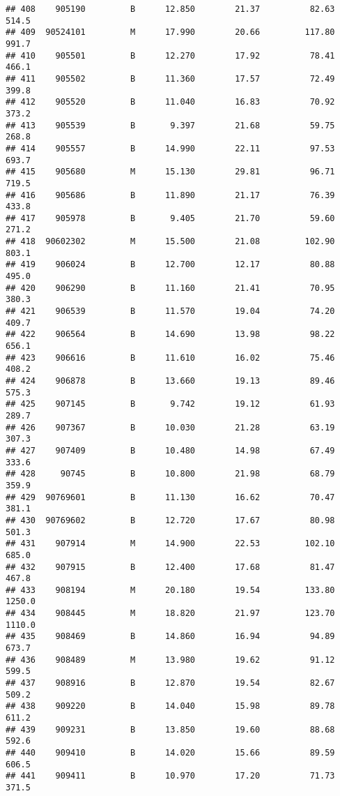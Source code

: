 \documentclass[
]{article}
\begin{document}
\begin{verbatim}
## 408    905190         B      12.850        21.37          82.63     514.5
## 409  90524101         M      17.990        20.66         117.80     991.7
## 410    905501         B      12.270        17.92          78.41     466.1
## 411    905502         B      11.360        17.57          72.49     399.8
## 412    905520         B      11.040        16.83          70.92     373.2
## 413    905539         B       9.397        21.68          59.75     268.8
## 414    905557         B      14.990        22.11          97.53     693.7
## 415    905680         M      15.130        29.81          96.71     719.5
## 416    905686         B      11.890        21.17          76.39     433.8
## 417    905978         B       9.405        21.70          59.60     271.2
## 418  90602302         M      15.500        21.08         102.90     803.1
## 419    906024         B      12.700        12.17          80.88     495.0
## 420    906290         B      11.160        21.41          70.95     380.3
## 421    906539         B      11.570        19.04          74.20     409.7
## 422    906564         B      14.690        13.98          98.22     656.1
## 423    906616         B      11.610        16.02          75.46     408.2
## 424    906878         B      13.660        19.13          89.46     575.3
## 425    907145         B       9.742        19.12          61.93     289.7
## 426    907367         B      10.030        21.28          63.19     307.3
## 427    907409         B      10.480        14.98          67.49     333.6
## 428     90745         B      10.800        21.98          68.79     359.9
## 429  90769601         B      11.130        16.62          70.47     381.1
## 430  90769602         B      12.720        17.67          80.98     501.3
## 431    907914         M      14.900        22.53         102.10     685.0
## 432    907915         B      12.400        17.68          81.47     467.8
## 433    908194         M      20.180        19.54         133.80    1250.0
## 434    908445         M      18.820        21.97         123.70    1110.0
## 435    908469         B      14.860        16.94          94.89     673.7
## 436    908489         M      13.980        19.62          91.12     599.5
## 437    908916         B      12.870        19.54          82.67     509.2
## 438    909220         B      14.040        15.98          89.78     611.2
## 439    909231         B      13.850        19.60          88.68     592.6
## 440    909410         B      14.020        15.66          89.59     606.5
## 441    909411         B      10.970        17.20          71.73     371.5

\end{verbatim}
\end{document}
